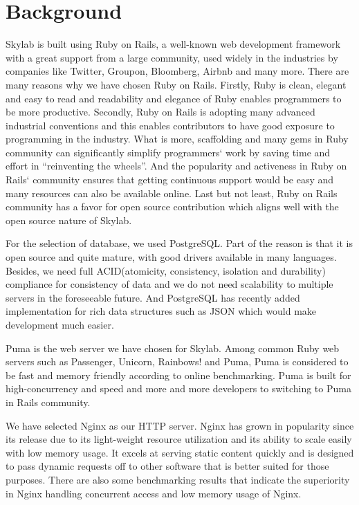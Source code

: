 \chapter{Background} \label{background}

Skylab is built using Ruby on Rails, a well-known web development framework with a great support from a large community, used widely in the industries by companies like Twitter, Groupon, Bloomberg, Airbnb and many more\cite{citation1}. There are many reasons why we have chosen Ruby on Rails. Firstly, Ruby is clean, elegant and easy to read and readability and elegance of Ruby enables programmers to be more productive. Secondly, Ruby on Rails is adopting many advanced industrial conventions and this enables contributors to have good exposure to programming in the industry. What is more, scaffolding and many gems in Ruby community can significantly simplify programmers` work by saving time and effort in ``reinventing the wheels''. And the popularity and activeness in Ruby on Rails` community ensures that getting continuous support would be easy and many resources can also be available online. Last but not least, Ruby on Rails community has a favor for open source contribution which aligns well with the open source nature of Skylab.

For the selection of database, we used PostgreSQL. Part of the reason is that it is open source and quite mature, with good drivers available in many languages\cite{citation2}. Besides, we need full ACID(atomicity, consistency, isolation and durability) compliance for consistency of data and we do not need scalability to multiple servers in the foreseeable future\cite{citationACID}. And PostgreSQL has recently added implementation for rich data structures such as JSON which would make development much easier\cite{citation3}.

Puma is the web server we have chosen for Skylab. Among common Ruby web servers such as Passenger, Unicorn, Rainbows! and Puma, Puma is considered to be fast and memory friendly according to online benchmarking\cite{citation4}. Puma is built for high-concurrency and speed and more and more developers to switching to Puma in Rails community\cite{citation5}.

We have selected Nginx as our HTTP server. Nginx has grown in popularity since its release due to its light-weight resource utilization and its ability to scale easily with low memory usage. It excels at serving static content quickly and is designed to pass dynamic requests off to other software that is better suited for those purposes\cite{citation6}. There are also some benchmarking results that indicate the superiority in Nginx handling concurrent access and low memory usage of Nginx\cite{citation7}.


